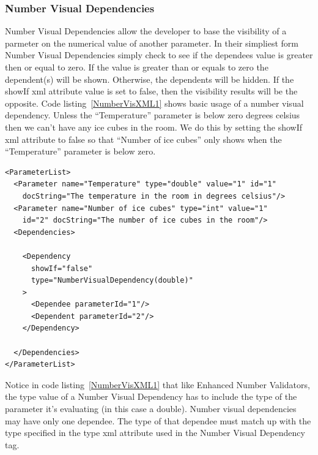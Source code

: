 \subsubsection{Number Visual Dependencies}
Number Visual Dependencies allow the developer to base the visibility of a parmeter on the numerical value of another parameter. In their simpliest form
Number Visual Dependencies simply check to see if the dependees value is greater then or equal to zero. If the value is greater than or equals to zero the
dependent(s) will be shown. Otherwise, the dependents will be hidden. If the showIf xml attribute value is set to false, then the visibility results will
be the opposite. Code listing~\ref{NumberVisXML1} shows basic usage of a number visual dependency. Unless the ``Temperature'' parameter is below zero degrees
celsius then we can't have any ice cubes in the room. We do this by setting the showIf xml attribute to false so that ``Number of ice cubes'' only shows
when the ``Temperature'' parameter is below zero.
\begin{lstlisting}[caption={Example usage of a Number Visual Dependency}, label=NumberVisXML1]
<ParameterList>
  <Parameter name="Temperature" type="double" value="1" id="1" 
    docString="The temperature in the room in degrees celsius"/>
  <Parameter name="Number of ice cubes" type="int" value="1"
    id="2" docString="The number of ice cubes in the room"/>
  <Dependencies>

    <Dependency 
      showIf="false" 
      type="NumberVisualDependency(double)"
    >
      <Dependee parameterId="1"/>
      <Dependent parameterId="2"/>
    </Dependency>

  </Dependencies>
</ParameterList>
\end{lstlisting}
Notice in code listing~\ref{NumberVisXML1} that like Enhanced Number Validators, the type value of a Number Visual Dependency has to include the type of the
parameter it's evaluating (in this case a double). Number visual dependencies may have only one dependee. The type of that dependee must match up with the
type specified in the type xml attribute used in the Number Visual Dependency tag.

